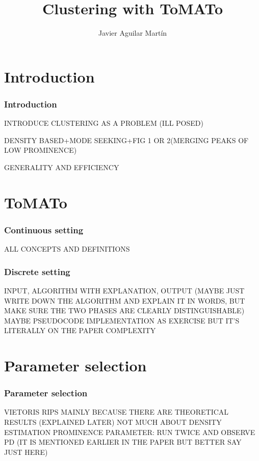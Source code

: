 \documentclass{beamer}
\title{Clustering with ToMATo}
\author{Javier Aguilar Mart\'in}
\institute{University of Kent}
\date{}
\theoremstyle{definition}
\begin{document}
\frame{\titlepage}





\newcommand{\seti}{\setcounter{saveenumi}{\value{enumi}}}
\newcommand{\conti}{\setcounter{enumi}{\value{saveenumi}}}

\makeatletter
\newcommand{\xRightarrow}[2][]{\ext@arrow 0359\Rightarrowfill@{#1}{#2}}
\makeatother




\section{Introduction}


\begin{frame}[fragile]
\frametitle{Introduction}
INTRODUCE CLUSTERING AS A PROBLEM (ILL POSED)

DENSITY BASED+MODE SEEKING+FIG 1 OR 2(MERGING PEAKS OF LOW PROMINENCE)

GENERALITY AND EFFICIENCY

\end{frame}

\section{ToMATo}
\begin{frame}[fragile]
\frametitle{Continuous setting}
ALL CONCEPTS AND DEFINITIONS
\end{frame}

\begin{frame}
\frametitle{Discrete setting}
INPUT, ALGORITHM WITH EXPLANATION, OUTPUT (MAYBE JUST WRITE DOWN THE ALGORITHM AND EXPLAIN IT IN WORDS, BUT MAKE SURE THE TWO PHASES ARE CLEARLY DISTINGUISHABLE) MAYBE PSEUDOCODE IMPLEMENTATION AS EXERCISE BUT IT'S LITERALLY ON THE PAPER
COMPLEXITY
\end{frame}

\section{Parameter selection}
\begin{frame}
\frametitle{Parameter selection}
VIETORIS RIPS MAINLY BECAUSE THERE ARE THEORETICAL RESULTS (EXPLAINED LATER)
NOT MUCH ABOUT DENSITY ESTIMATION
PROMINENCE PARAMETER: RUN TWICE AND OBSERVE PD (IT IS MENTIONED EARLIER IN THE PAPER BUT BETTER SAY JUST HERE)
\end{frame}
\end{document}
